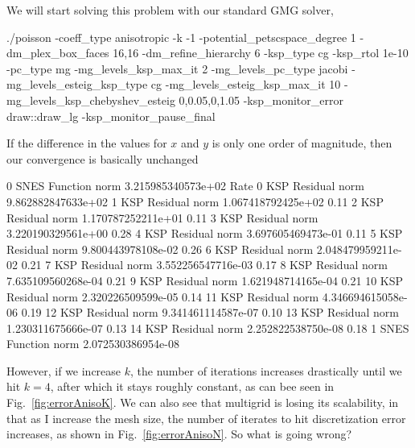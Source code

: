 \begin{refsection}
We will start solving this problem with our standard GMG solver,
\begin{bash}
./poisson -coeff_type anisotropic -k -1
  -potential_petscspace_degree 1 -dm_plex_box_faces 16,16 -dm_refine_hierarchy 6
  -ksp_type cg -ksp_rtol 1e-10
  -pc_type mg -mg_levels_ksp_max_it 2 -mg_levels_pc_type jacobi
    -mg_levels_esteig_ksp_type cg -mg_levels_esteig_ksp_max_it 10 -mg_levels_ksp_chebyshev_esteig 0,0.05,0,1.05
  -ksp_monitor_error draw::draw_lg -ksp_monitor_pause_final
\end{bash}
If the difference in the values for $x$ and $y$ is only one order of magnitude, then our convergence is basically unchanged
\begin{bash}
0 SNES Function norm 3.215985340573e+02   Rate
  0 KSP Residual norm 9.862882847633e+02
  1 KSP Residual norm 1.067418792425e+02  0.11
  2 KSP Residual norm 1.170787252211e+01  0.11
  3 KSP Residual norm 3.220190329561e+00  0.28
  4 KSP Residual norm 3.697605469473e-01  0.11
  5 KSP Residual norm 9.800443978108e-02  0.26
  6 KSP Residual norm 2.048479959211e-02  0.21
  7 KSP Residual norm 3.552256547716e-03  0.17
  8 KSP Residual norm 7.635109560268e-04  0.21
  9 KSP Residual norm 1.621948714165e-04  0.21
 10 KSP Residual norm 2.320226509599e-05  0.14
 11 KSP Residual norm 4.346694615058e-06  0.19
 12 KSP Residual norm 9.341461114587e-07  0.10
 13 KSP Residual norm 1.230311675666e-07  0.13
 14 KSP Residual norm 2.252822538750e-08  0.18
1 SNES Function norm 2.072530386954e-08
\end{bash}
However, if we increase $k$, the number of iterations increases drastically until we hit $k = 4$, after which it stays roughly constant, as can bee seen in Fig.~\ref{fig:errorAnisoK}. We can also see that multigrid is losing its scalability, in that as I increase the mesh size, the number of iterates to hit discretization error increases, as shown in Fig.~\ref{fig:errorAnisoN}. So what is going wrong?


\end{refsection}
